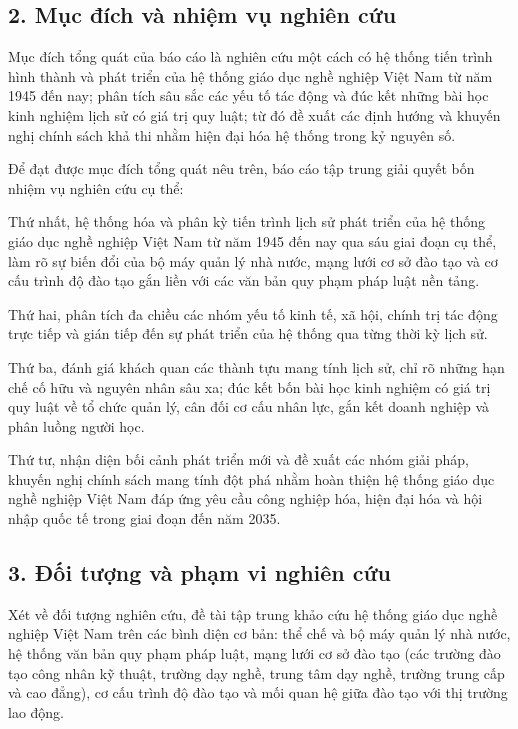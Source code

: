 \subsection*{2. Mục đích và nhiệm vụ nghiên cứu}

Mục đích tổng quát của báo cáo là nghiên cứu một cách có hệ thống tiến trình hình thành và phát triển của hệ thống giáo dục nghề nghiệp Việt Nam từ năm 1945 đến nay; phân tích sâu sắc các yếu tố tác động và đúc kết những bài học kinh nghiệm lịch sử có giá trị quy luật; từ đó đề xuất các định hướng và khuyến nghị chính sách khả thi nhằm hiện đại hóa hệ thống trong kỷ nguyên số.

Để đạt được mục đích tổng quát nêu trên, báo cáo tập trung giải quyết bốn nhiệm vụ nghiên cứu cụ thể:

Thứ nhất, hệ thống hóa và phân kỳ tiến trình lịch sử phát triển của hệ thống giáo dục nghề nghiệp Việt Nam từ năm 1945 đến nay qua sáu giai đoạn cụ thể, làm rõ sự biến đổi của bộ máy quản lý nhà nước, mạng lưới cơ sở đào tạo và cơ cấu trình độ đào tạo gắn liền với các văn bản quy phạm pháp luật nền tảng.

Thứ hai, phân tích đa chiều các nhóm yếu tố kinh tế, xã hội, chính trị tác động trực tiếp và gián tiếp đến sự phát triển của hệ thống qua từng thời kỳ lịch sử.

Thứ ba, đánh giá khách quan các thành tựu mang tính lịch sử, chỉ rõ những hạn chế cố hữu và nguyên nhân sâu xa; đúc kết bốn bài học kinh nghiệm có giá trị quy luật về tổ chức quản lý, cân đối cơ cấu nhân lực, gắn kết doanh nghiệp và phân luồng người học.

Thứ tư, nhận diện bối cảnh phát triển mới và đề xuất các nhóm giải pháp, khuyến nghị chính sách mang tính đột phá nhằm hoàn thiện hệ thống giáo dục nghề nghiệp Việt Nam đáp ứng yêu cầu công nghiệp hóa, hiện đại hóa và hội nhập quốc tế trong giai đoạn đến năm 2035.

\subsection*{3. Đối tượng và phạm vi nghiên cứu}

Xét về đối tượng nghiên cứu, đề tài tập trung khảo cứu hệ thống giáo dục nghề nghiệp Việt Nam trên các bình diện cơ bản: thể chế và bộ máy quản lý nhà nước, hệ thống văn bản quy phạm pháp luật, mạng lưới cơ sở đào tạo (các trường đào tạo công nhân kỹ thuật, trường dạy nghề, trung tâm dạy nghề, trường trung cấp và cao đẳng), cơ cấu trình độ đào tạo và mối quan hệ giữa đào tạo với thị trường lao động.

